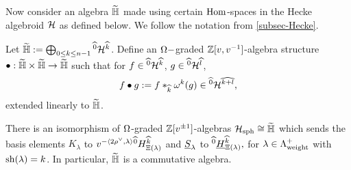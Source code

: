 Now consider an algebra $\widetilde{\mathbb{H}}$ made using certain $\operatorname{Hom}$-spaces in the Hecke algebroid $\mathcal{H}$ as defined below. We follow the notation from \cref{subsec-Hecke}.
\begin{defn}
  Let  $\widetilde{\mathbb{H}}:= \bigoplus_{0 \leq k \leq n-1}{}^{\widehat{0}}\mathcal{H}^{\widehat{k}}$. 
  Define an $\Omega-$graded $\mathbb{Z}[v,v^{-1}]$-algebra structure 
  $\bullet:\widetilde{\mathbb{H}} \times \widetilde{\mathbb{H}} \rightarrow \widetilde{\mathbb{H}}$ such that
  for $f \in {}^{\widehat{0}}\mathcal{H}^{\widehat{k}}$, $g \in {}^{\widehat{0}}\mathcal{H}^{\widehat{l}}$,
\begin{equation} \label{eq multiplication in HHHH}
    f\bullet g:= f\ast_{\widehat{k}}\omega^k(g) \in {}^{\widehat{0}}\mathcal{H}^{\widehat{k+l}},
\end{equation}
extended linearly to $\widetilde{\mathbb{H}}$. 
\end{defn}

\begin{lemma}\label{lemma HHHH isomorphic to spherical Hecke algebra}
  There is an isomorphism of $\Omega$-graded $\mathbb{Z}[v^{\pm 1}]$-algebras
  $\mathcal{H}_{\operatorname{sph}} \cong \widetilde{\mathbb{H}}$
  which sends the basis elements $K_\lambda$ to $v^{-\langle2 \rho^\vee, \lambda \rangle} {}^{\widehat{0}}H^{\widehat{k}}_{\Xi(\lambda)}$ and $\underline{S}_\lambda$ to ${}^{\widehat{0}}\underline{H}^{\widehat{k}}_{\Xi(\lambda)},$ for $\lambda \in \Lambda_{\operatorname{weight}}^+$ with $\operatorname{sh}(\lambda)=k$. In particular, $\widetilde{\mathbb{H}}$ is a commutative algebra.
\end{lemma}
